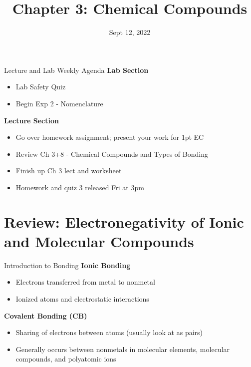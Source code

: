 \documentclass[11pt]{beamer}
\title{Chapter 3: Chemical Compounds}
\institute{Chemistry Department, Cypress College}
\date{Sept 12, 2022}
\begin{document}
\begin{frame}
  \titlepage
\end{frame}

\begin{frame}{Lecture and Lab Weekly Agenda}
  \textbf{Lab Section}

  \begin{itemize}
  \item Lab Safety Quiz
  \item Begin Exp 2 - Nomenclature
  \end{itemize}

  \textbf{Lecture Section}

  \begin{itemize}
  \item Go over homework assignment; present your work
    for 1pt EC
  \item Review Ch 3+8 - Chemical Compounds and Types of Bonding
  \item Finish up Ch 3 lect and worksheet
  \item Homework and quiz 3 released Fri at 3pm
  \end{itemize}
\end{frame}

\section{Review: Electronegativity of Ionic and Molecular Compounds}

\begin{frame}{Introduction to Bonding}
  \textbf{Ionic Bonding}
  \begin{itemize}
  \item Electrons transferred from metal
    to nonmetal
  \item Ionized atoms and electrostatic interactions
  \end{itemize}

  \textbf{Covalent Bonding (CB)}
  \begin{itemize}
  \item Sharing of electrons between atoms (usually
    look at as pairs)
  \item Generally occurs between nonmetals in molecular
    elements, molecular compounds, and polyatomic ions
  \end{itemize}
\end{frame}
\end{document}
